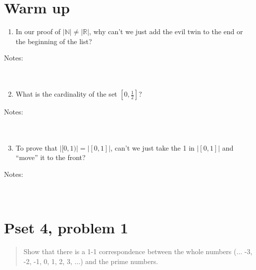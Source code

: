 \documentclass[justified]{tufte-handout}
\begin{document}
\section{Warm up}

\begin{enumerate}
\item In our proof of $|\mathbb{N}|\neq|\mathbb{R}|$, why can't we just add the evil twin to the end or the beginning of the list? \end{enumerate}
\noindent Notes:  \underline{\hspace{15.75cm}}\\\\\underline{\hspace{16.88cm}}\\

\begin{enumerate}
\setcounter{enumi}{1}
\item What is the cardinality of the set $[0,\frac{1}{2}]$?\end{enumerate}
\noindent Notes:  \underline{\hspace{15.75cm}}\\\\\underline{\hspace{16.88cm}}\\

\begin{enumerate}
\setcounter{enumi}{2}
\item To prove that $|[0,1)|=|[0,1]|$, can't we just take the 1 in $|[0,1]|$ and ``move'' it to the front? \end{enumerate}
\noindent Notes:  \underline{\hspace{15.75cm}}\\\\\underline{\hspace{16.88cm}}\\


\section{Pset 4, problem 1}

\begin{quote}
Show that there is a 1-1 correspondence between the whole numbers ($\dots$ -3, -2, -1, 0, 1, 2, 3, $\dots$) and the prime numbers.
\end{quote}
\end{document}
